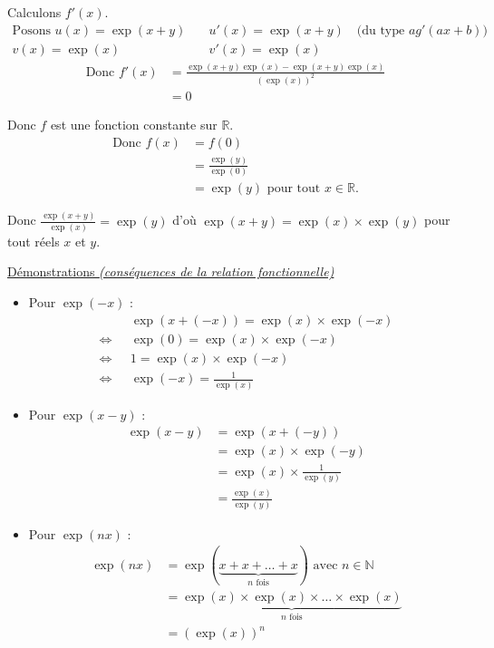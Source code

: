 \documentclass[11pt,a4paper]{article}
\begin{document}
Calculons $f'(x)$.
\vspace{-6pt}
\begin{align*}
    \text{Posons }u(x)=\exp(x+y)\quad&u'(x)=\exp(x+y) \quad\text{(du type $ag'(ax+b)$)}\\
    v(x)=\exp(x)\quad\text{ }\quad\text{ }&v'(x)=\exp(x) 
\end{align*}
\begin{align*}
    \text{Donc }f'(x)&=\frac{\exp(x+y)\exp(x)-\exp(x+y)\exp(x)}{(\exp(x))^2} \\
    &=0
\end{align*}

Donc $f$ est une fonction constante sur $\mathbb{R}$.
\begin{align*}
    \text{Donc }f(x)&=f(0) \\
    &=\frac{\exp(y)}{\exp(0)} \\
    &=\exp(y)\text{ pour tout } x\in\mathbb{R}\text{.}
\end{align*}

Donc $\frac{\exp(x+y)}{\exp(x)}=\exp(y)$ d'où $\exp(x+y)=\exp(x)\times\exp(y)$ pour tout réels $x$ et $y$.

\newpage

\underline{Démonstrations \emph{(conséquences de la relation fonctionnelle)}}
\begin{itemize}
    \item Pour $\exp(-x)$ :
    \begin{align*}
        &\exp(x+(-x))=\exp(x)\times\exp(-x) \\
        \Leftrightarrow\text{ }&\exp(0)= \exp(x)\times\exp(-x)\\
        \Leftrightarrow\text{ }& 1=\exp(x)\times\exp(-x)\\
        \Leftrightarrow\text{ }&\exp(-x)=\frac{1}{\exp(x)}
    \end{align*}
    \item Pour $\exp(x-y)$ :
    \begin{align*}
        \exp(x-y)&=\exp(x+(-y)) \\
        &=\exp(x)\times\exp(-y)\\
        & =\exp(x)\times\frac{1}{\exp(y)}\\
        &=\frac{\exp(x)}{\exp(y)}
    \end{align*}
    \item Pour $\exp(nx)$ :
    \begin{align*}
        \exp(nx)&=\exp(\underbrace{x+x+\dots+x}_{\text{$n$ fois}}) \text{ avec $n\in\mathbb{N}$} \\
        &=\underbrace{\exp(x)\times\exp(x)\times\dots\times\exp(x)}_{\text{$n$ fois}}\\
        & =\left(\exp(x)\right)^n
    \end{align*}

\end{itemize}
\end{document}
